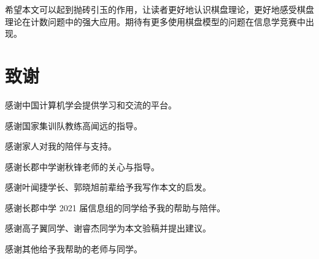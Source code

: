 \documentclass{noithesis}
\begin{document}
	希望本文可以起到抛砖引玉的作用，让读者更好地认识棋盘理论，更好地感受棋盘理论在计数问题中的强大应用。期待有更多使用棋盘模型的问题在信息学竞赛中出现。
	
	\section{致谢}
	
	感谢中国计算机学会提供学习和交流的平台。
	
	感谢国家集训队教练高闻远的指导。
	
	感谢家人对我的陪伴与支持。
	
	感谢长郡中学谢秋锋老师的关心与指导。
	
	感谢叶闻捷学长、郭晓旭前辈给予我写作本文的启发。
	
	感谢长郡中学 2021 届信息组的同学给予我的帮助与陪伴。
	
	感谢高子翼同学、谢睿杰同学为本文验稿并提出建议。
	
	感谢其他给予我帮助的老师与同学。
	
	
\end{document}

